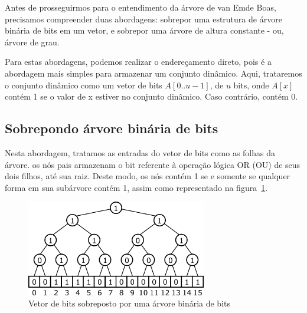 \documentclass[12pt]{article}
\begin{document}
Antes de prosseguirmos para o entendimento da árvore de van Emde Boas, precisamos compreender duas abordagens: sobrepor uma estrutura de árvore binária de bits em um vetor, e sobrepor uma árvore de altura constante - ou, árvore de grau.

Para estas abordagens, podemos realizar o endereçamento direto, pois é a abordagem mais simples para armazenar um conjunto dinâmico. Aqui, trataremos o conjunto dinâmico como um vetor de bits $A[0..u-1]$, de $u$ bits, onde $A[x]$ contém 1 se o valor de x estiver no conjunto dinâmico. Caso contrário, contém 0.

\subsection{Sobrepondo árvore binária de bits}

Nesta abordagem, tratamos as entradas do vetor de bits como as folhas da árvore. os nós pais armazenam o bit referente à operação lógica OR (OU) de seus dois filhos, até sua raiz. Deste modo, os nós contém 1 se e somente se qualquer forma em sua subárvore contém 1, assim como representado na figura~\ref{fig:arvoreBinariaBits}.

\begin{figure}[ht]
\centering
\includegraphics[width=0.7\textwidth]{arvoreBinariaBits.png}
\caption{Vetor de bits sobreposto por uma árvore binária de bits}
\label{fig:arvoreBinariaBits}
\end{figure}
\end{document}
